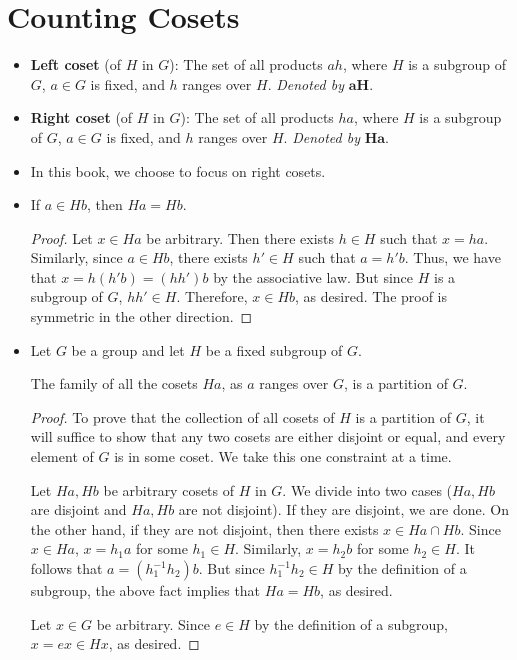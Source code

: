 \documentclass[../notes.tex]{subfiles}
\begin{document}
\chapter{Counting Cosets}
\begin{itemize}
    \item {}\textbf{Left coset} (of $H$ in $G$): The set of all products $ah$, where $H$ is a subgroup of $G$, $a\in G$ is fixed, and $h$ ranges over $H$. \emph{Denoted by} $\bm{aH}$.
    \item \textbf{Right coset} (of $H$ in $G$): The set of all products $ha$, where $H$ is a subgroup of $G$, $a\in G$ is fixed, and $h$ ranges over $H$. \emph{Denoted by} $\bm{Ha}$.
    \item In this book, we choose to focus on right cosets.
    \item If $a\in Hb$, then $Ha=Hb$.
    \begin{proof}
        Let $x\in Ha$ be arbitrary. Then there exists $h\in H$ such that $x=ha$. Similarly, since $a\in Hb$, there exists $h'\in H$ such that $a=h'b$. Thus, we have that $x=h(h'b)=(hh')b$ by the associative law. But since $H$ is a subgroup of $G$, $hh'\in H$. Therefore, $x\in Hb$, as desired. The proof is symmetric in the other direction.
    \end{proof}
    \item Let $G$ be a group and let $H$ be a fixed subgroup of $G$.
    \begin{theorem}
        The family of all the cosets $Ha$, as $a$ ranges over $G$, is a partition of $G$.
        \begin{proof}
            To prove that the collection of all cosets of $H$ is a partition of $G$, it will suffice to show that any two cosets are either disjoint or equal, and every element of $G$ is in some coset. We take this one constraint at a time.\par
            Let $Ha,Hb$ be arbitrary cosets of $H$ in $G$. We divide into two cases ($Ha,Hb$ are disjoint and $Ha,Hb$ are not disjoint). If they are disjoint, we are done. On the other hand, if they are not disjoint, then there exists $x\in Ha\cap Hb$. Since $x\in Ha$, $x=h_1a$ for some $h_1\in H$. Similarly, $x=h_2b$ for some $h_2\in H$. It follows that $a=(h_1^{-1}h_2)b$. But since $h_1^{-1}h_2\in H$ by the definition of a subgroup, the above fact implies that $Ha=Hb$, as desired.\par
            Let $x\in G$ be arbitrary. Since $e\in H$ by the definition of a subgroup, $x=ex\in Hx$, as desired.
        \end{proof}

\end{theorem}
\end{itemize}
\end{document}
